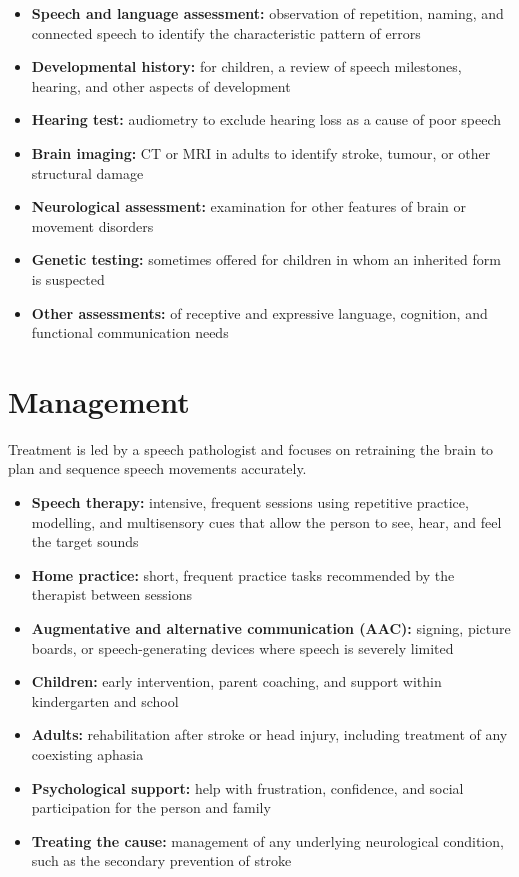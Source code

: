 \begin{itemize}
    \item \textbf{Speech and language assessment:} observation of repetition, naming, and connected speech to identify the characteristic pattern of errors
    \item \textbf{Developmental history:} for children, a review of speech milestones, hearing, and other aspects of development
    \item \textbf{Hearing test:} audiometry to exclude hearing loss as a cause of poor speech
    \item \textbf{Brain imaging:} CT or MRI in adults to identify stroke, tumour, or other structural damage
    \item \textbf{Neurological assessment:} examination for other features of brain or movement disorders
    \item \textbf{Genetic testing:} sometimes offered for children in whom an inherited form is suspected
    \item \textbf{Other assessments:} of receptive and expressive language, cognition, and functional communication needs
\end{itemize}

\section*{Management}
Treatment is led by a speech pathologist and focuses on retraining the brain to plan and sequence speech movements accurately.

\begin{itemize}
    \item \textbf{Speech therapy:} intensive, frequent sessions using repetitive practice, modelling, and multisensory cues that allow the person to see, hear, and feel the target sounds
    \item \textbf{Home practice:} short, frequent practice tasks recommended by the therapist between sessions
    \item \textbf{Augmentative and alternative communication (AAC):} signing, picture boards, or speech-generating devices where speech is severely limited
    \item \textbf{Children:} early intervention, parent coaching, and support within kindergarten and school
    \item \textbf{Adults:} rehabilitation after stroke or head injury, including treatment of any coexisting aphasia
    \item \textbf{Psychological support:} help with frustration, confidence, and social participation for the person and family
    \item \textbf{Treating the cause:} management of any underlying neurological condition, such as the secondary prevention of stroke
\end{itemize}

